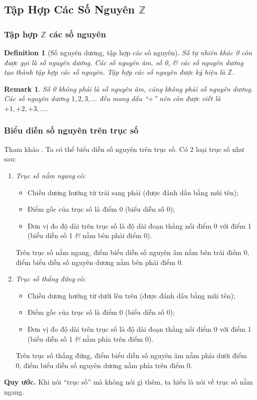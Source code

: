 \documentclass{article}
\numberwithin{equation}{section}
\newtheorem{definition}{Definition}[section]
\newtheorem{remark}{Remark}[section]
\begin{document}
\subsection{Tập Hợp Các Số Nguyên $\mathbb{Z}$}

\subsubsection{Tập hợp $\mathbb{Z}$ các số nguyên}

\begin{definition}[Số nguyên dương, tập hợp các số nguyên]
	Số tự nhiên khác 0 còn được gọi là \emph{số nguyên dương}. Các số nguyên âm, số 0, \textit{\&} các số nguyên dương tạo thành tập hợp các số nguyên. Tập hợp các số nguyên được ký hiệu là $\mathbb{Z}$.
\end{definition}

\begin{remark}
	Số 0 không phải là số nguyên âm, cũng không phải số nguyên dương. Các số nguyên dương $1,2,3,\ldots$ đều mang dấu ``$+$'' nên còn được viết là $+1,+2,+3,\ldots$.
\end{remark}

\subsubsection{Biểu diễn số nguyên trên trục số}
Tham khảo \cite[pp. 65--66]{Thai_Anh_Dat_Ha_Loan_Nam_Quang_Toan_6_tap_1}. Ta có thể biểu diễn số nguyên trên trục số. Có 2 loại trục số như sau:
\begin{enumerate}
	\item \textit{Trục số nằm ngang} có:
	\begin{itemize}
		\item Chiều dương hướng từ trái sang phải (được đánh dấu bằng mũi tên);
		\item Điểm gốc của trục số là điểm 0 (biểu diễn số 0);
		\item Đơn vị đo độ dài trên trục số là độ dài đoạn thẳng nối điểm 0 với điểm 1 (biểu diễn số 1 \textit{\&} nằm bên phải điểm 0).
	\end{itemize}
	Trên trục số nằm ngang, điểm biểu diễn số nguyên âm nằm bên trái điểm 0, điểm biểu diễn số nguyên dương nằm bên phải điểm 0.
	\item \textit{Trục số thẳng đứng} có:
	\begin{itemize}
		\item Chiều dương hướng từ dưới lên trên (được đánh dấu bằng mũi tên);
		\item Điểm gốc của trục số là điểm 0 (biểu diễn số 0);
		\item Đơn vị đo độ dài trên trục số là độ dài đoạn thẳng nối điểm 0 với điểm 1 (biểu diễn số 1 \textit{\&} nằm phía trên điểm 0).
	\end{itemize}
	Trên trục số thẳng đứng, điểm biểu diễn số nguyên âm nằm phía dưới điểm 0, điểm biểu diễn số nguyên dương nằm phía trên điểm 0.
\end{enumerate}
\noindent\textbf{Quy ước.} Khi nói ``trục số'' mà không nói gì thêm, ta hiểu là nói về trục số nằm ngang.
\end{document}
